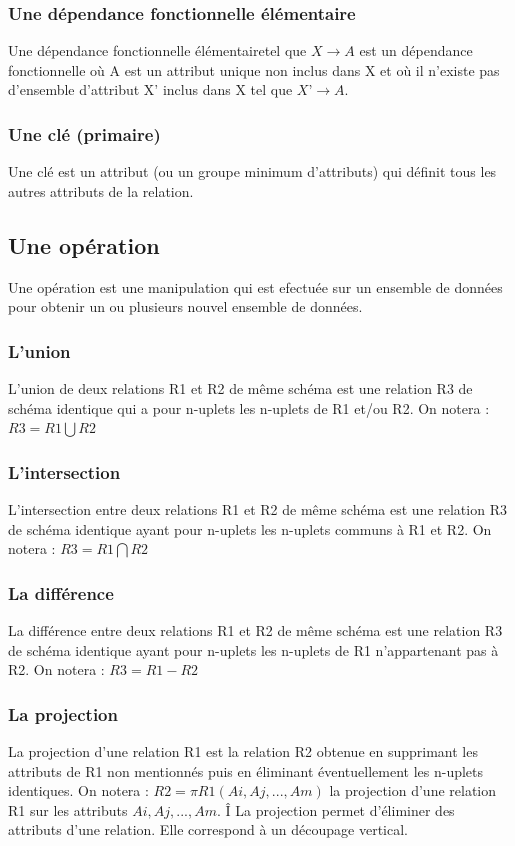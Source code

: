 \documentclass[12pt, a4paper, oneside, titlepage]{book}%
\begin{document}
\subsubsection{Une dépendance fonctionnelle élémentaire}
Une dépendance fonctionnelle élémentairetel que $X \rightarrow A$ est un dépendance fonctionnelle où A est un attribut unique non inclus dans X et où il n’existe pas d'ensemble d'attribut X’ inclus dans X tel que $X’ \rightarrow A$.

\subsubsection{Une clé (primaire)}
Une clé est un attribut (ou un groupe minimum d'attributs) qui définit tous les autres attributs de la relation.

\subsection{Une opération}
Une opération est une manipulation qui est efectuée sur un ensemble de données pour obtenir un ou plusieurs nouvel ensemble de données.

\subsubsection{L'union}
L'union de deux relations R1 et R2 de même schéma est une relation R3 de schéma identique qui a pour n-uplets les n-uplets de R1 et/ou R2.
On notera : $R3 = R1 \bigcup R2$

\subsubsection{L'intersection}
L’intersection entre deux relations R1 et R2 de même schéma est une relation R3 de schéma identique ayant pour n-uplets les n-uplets communs à R1 et R2.
On notera : $R3 = R1 \bigcap R2$

\subsubsection{La différence}
La différence entre deux relations R1 et R2 de même schéma est une relation R3 de schéma identique ayant pour n-uplets les n-uplets de R1 n'appartenant pas à R2.
On notera : $R3 = R1 -  R2$

\subsubsection{La projection}
La projection d'une relation R1 est la relation R2 obtenue en supprimant les attributs de R1 non mentionnés puis en éliminant éventuellement les n-uplets identiques.
On notera : $R2 = \pi R1 (Ai, Aj, ... , Am)$ la projection d'une relation R1 sur les attributs $Ai, Aj, ... , Am$.
Î
 La projection permet d’éliminer des attributs d’une relation.  Elle correspond à un découpage vertical.
\end{document}
